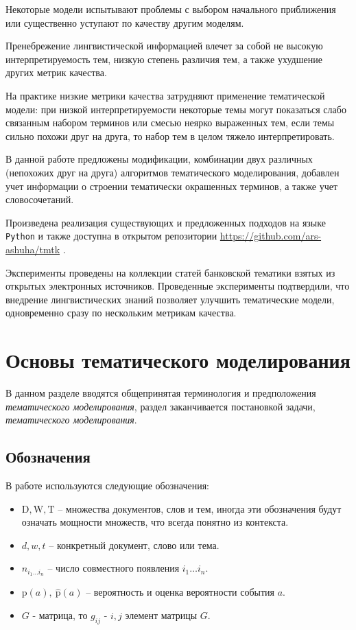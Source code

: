 \documentclass[a4paper, 14pt]{extarticle}
\begin{document}
Некоторые модели испытывают проблемы с выбором начального приближения или существенно уступают по качеству другим моделям. 

Пренебрежение лингвистической информацией влечет за собой не высокую интерпретируемость тем, низкую степень различия тем, а также ухудшение других метрик качества. 

На практике низкие метрики качества затрудняют применение тематической модели: при низкой интерпретируемости некоторые темы могут показаться слабо связанным набором терминов или смесью неярко выраженных тем, если темы сильно похожи друг на друга, то набор тем в целом тяжело интерпретировать.   

В данной работе предложены модификации, комбинации двух различных (непохожих друг на друга) алгоритмов тематического моделирования, добавлен учет информации о строении тематически окрашенных терминов, а также учет словосочетаний.

Произведена реализация существующих и предложенных подходов на языке \texttt{Python} и также доступна в открытом репозитории \href{https://github.com/ars-ashuha/tmtk}{https://github.com/ars-ashuha/tmtk} .  

Эксперименты проведены на коллекции статей банковской тематики взятых из открытых электронных источников. Проведенные эксперименты подтвердили, что внедрение лингвистических знаний позволяет улучшить тематические модели, одновременно сразу по нескольким метрикам качества.   
\newpage

\section{Основы тематического моделирования}
	В данном разделе вводятся общепринятая терминология и предположения \emph{тематического моделирования}, раздел заканчивается постановкой задачи, \emph{тематического моделирования}.
	\subsection{Обозначения}
	В работе используются следующие обозначения:
	\begin{itemize}
		\item $\mathrm{D}, \mathrm{W}, \mathrm{T}$ -- множества документов, слов и тем, иногда эти обозначения будут означать мощности множеств, что всегда понятно из контекста.
		\item $d, w, t$ -- конкретный документ, слово или тема.
		\item $n_{i_1\dots i_n}$ -- число совместного появления $i_1\dots i_n$.
		\item $\mathrm{p}(a),~\hat{\mathrm{p}}(a)$ -- вероятность и оценка вероятности события $a$.
		\item $G$ - матрица, то $g_{ij}$ - $i, j$ элемент матрицы $G$.
	\end{itemize}
	
\end{document}
